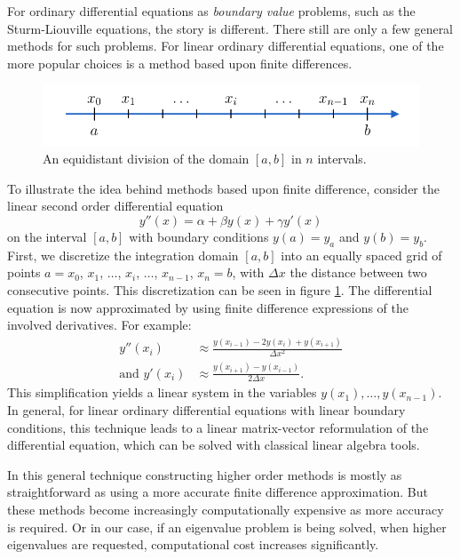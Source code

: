 For ordinary differential equations as \emph{boundary value} problems, such as the Sturm-Liouville equations, the story is different. There still are only a few general methods for such problems. For linear ordinary differential equations, one of the more popular choices is a method based upon finite differences.

\begin{figure}
    \begin{center}
        \includegraphics[width=\textwidth]{img/chapter2/finite_difference_grid.pdf}
    \end{center}
    \caption{An equidistant division of the domain $[a, b]$ in $n$ intervals.}
    \label{fig:c2_finite_difference_grid}
\end{figure}

To illustrate the idea behind methods based upon finite difference, consider the linear second order differential equation
$$
    y''(x) = \alpha + \beta y(x) + \gamma y'(x)
$$
on the interval $[a, b]$ with boundary conditions $y(a) = y_a$ and $y(b) = y_b$. First, we discretize the integration domain $[a, b]$ into an equally spaced grid of points $a = x_0$, $x_1$, $\dots$, $x_i$, $\dots$, $x_{n-1}$, $x_{n} = b$, with $\Delta x$ the distance between two consecutive points. This discretization can be seen in figure \ref{fig:c2_finite_difference_grid}. The differential equation is now approximated by using finite difference expressions of the involved derivatives. For example:
\begin{align*}
    y''(x_i)            & \approx \frac{y(x_{i-1}) - 2 y(x_i) + y(x_{i+1})}{\Delta x^2} \\
    \text{and } y'(x_i) & \approx \frac{y(x_{i+1}) - y(x_{i-1})}{2 \Delta x}\text{.}
\end{align*}
This simplification yields a linear system in the variables $y(x_1), \dots, y(x_{n-1})$. In general, for linear ordinary differential equations with linear boundary conditions, this technique leads to a linear matrix-vector reformulation of the differential equation, which can be solved with classical linear algebra tools.

In this general technique constructing higher order methods is mostly as straightforward as using a more accurate finite difference approximation. But these methods become increasingly computationally expensive as more accuracy is required. Or in our case, if an eigenvalue problem is being solved, when higher eigenvalues are requested, computational cost increases significantly.

